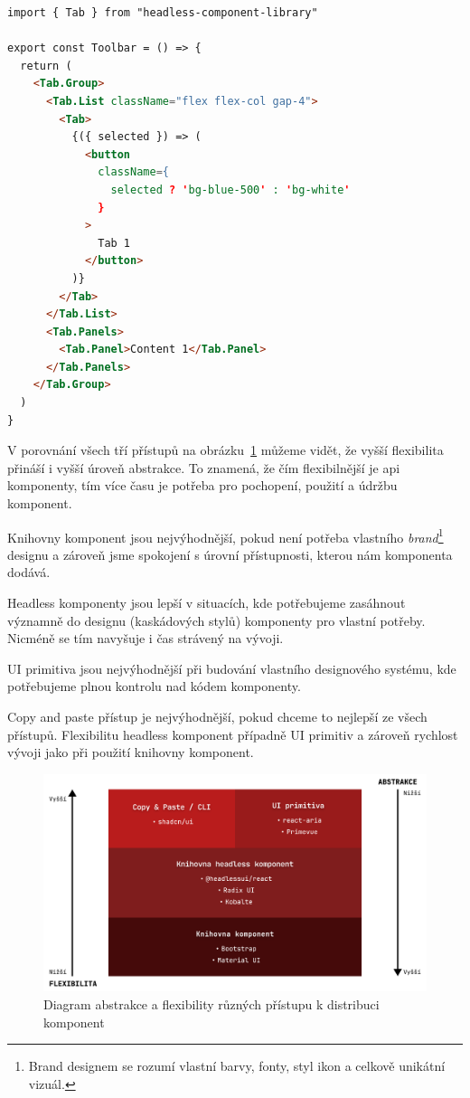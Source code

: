 \begin{lstlisting}[caption={Ukázka použití headless knihovny}, label={component-distribution-2}, language=html]
import { Tab } from "headless-component-library"

export const Toolbar = () => {
  return (
    <Tab.Group>
      <Tab.List className="flex flex-col gap-4">
        <Tab>
          {({ selected }) => (
            <button
              className={
                selected ? 'bg-blue-500' : 'bg-white'
              }
            >
              Tab 1
            </button>
          )}
        </Tab>
      </Tab.List>
      <Tab.Panels>
        <Tab.Panel>Content 1</Tab.Panel>
      </Tab.Panels>
    </Tab.Group>
  )
}
\end{lstlisting}

V porovnání všech tří přístupů na obrázku~\ref{component-lib-distribution-comparison} můžeme vidět, že vyšší flexibilita přináší i vyšší úroveň abstrakce.
To znamená, že čím flexibilnější je \gls{api} komponenty, tím více času je potřeba pro pochopení, použití a údržbu komponent.

Knihovny komponent jsou nejvýhodnější, pokud není potřeba vlastního \textit{brand}\footnote{Brand designem se rozumí vlastní barvy, fonty, styl ikon a celkově unikátní vizuál.} designu a zároveň jsme spokojení s úrovní přístupnosti, kterou nám komponenta dodává.

Headless komponenty jsou lepší v situacích, kde potřebujeme zasáhnout významně do designu (kaskádových stylů) komponenty pro vlastní potřeby.
Nicméně se tím navyšuje i čas strávený na vývoji.

UI primitiva jsou nejvýhodnější při budování vlastního designového systému, kde potřebujeme plnou kontrolu nad kódem komponenty.

Copy and paste přístup je nejvýhodnější, pokud chceme to nejlepší ze všech přístupů.
Flexibilitu headless komponent případně UI primitiv a zároveň rychlost vývoji jako při použití knihovny komponent.

\begin{figure}[h]
  \centering
  \includegraphics[width=\textwidth]{./assets/figures/component-lib-distribution-comparison.png}
  \captionsetup{justification=centering}
  \caption{Diagram abstrakce a flexibility různých přístupu k distribuci komponent}
  \label{component-lib-distribution-comparison}
\end{figure}

